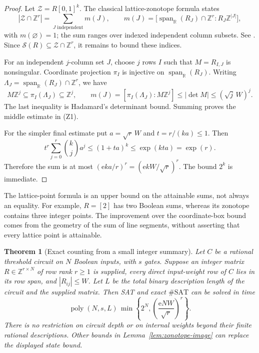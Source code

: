 \documentclass[11pt]{article}
\newtheorem{theorem}{Theorem}[section]
\theoremstyle{definition}
\newcommand{\R}{\mathbb R}
\newcommand{\Z}{\mathbb Z}
\newcommand{\poly}{\operatorname{poly}}
\newcommand{\Eul}{\mathrm e}
\begin{document}
\begin{proof}
Let \(\mathcal Z=R[0,1]^k\). The classical lattice-zonotope formula states
\[
 |\mathcal Z\cap\Z^r|
 =\sum_{J\text{ independent}}m(J),\qquad
 m(J)=\bigl[\operatorname{span}_{\R}(R_J)\cap\Z^r:
                    R_J\Z^{|J|}\bigr],                  \tag{Z2}
\]
with \(m(\varnothing)=1\); the sum ranges over indexed independent column
subsets. See \cite[Section 2.2 and equation (2)]{DM11}. Since
\(\mathcal S(R)\subseteq\mathcal Z\cap\Z^r\), it remains to bound these indices.

For an independent \(j\)-column set \(J\), choose \(j\) rows \(I\) such that
\(M=R_{I,J}\) is nonsingular. Coordinate projection \(\pi_I\) is injective
on \(\operatorname{span}_{\R}(R_J)\). Writing
\(\Lambda_J=\operatorname{span}_{\R}(R_J)\cap\Z^r\), we have
\[
 M\Z^j\subseteq\pi_I(\Lambda_J)\subseteq\Z^j,
 \qquad
 m(J)=[\pi_I(\Lambda_J):M\Z^j]
       \le |\det M|
       \le(\sqrt j\,W)^j.
\]
The last inequality is Hadamard's determinant bound. Summing proves the
middle estimate in (Z1).

For the simpler final estimate put \(a=\sqrt r\,W\) and
\(t=r/(ka)\le1\). Then
\[
 t^r\sum_{j=0}^r\binom kj a^j
 \le(1+ta)^k\le\exp(kta)=\exp(r).
\]
Therefore the sum is at most
\((\Eul ka/r)^r=(\Eul kW/\sqrt r)^r\). The bound \(2^k\) is immediate.
\end{proof}

The lattice-point formula is an upper bound on the attainable sums, not
always an equality. For example, \(R=[2]\) has two Boolean sums, whereas
its zonotope contains three integer points. The improvement over the
coordinate-box bound comes from the geometry of the sum of line segments,
without asserting that every lattice point is attainable.

\begin{theorem}[Exact counting from a small integer summary]
\label{thm:zonotope-counting}
Let \(C\) be a rational threshold circuit on \(N\) Boolean inputs, with
\(s\) gates. Suppose an integer matrix \(R\in\Z^{r\times N}\) of row rank
\(r\ge1\) is supplied, every direct input-weight row of \(C\) lies in its
row span, and \(|R_{ij}|\le W\). Let \(L\) be the total binary description
length of the circuit and the supplied matrix. Then SAT and exact \(\#\mathrm{SAT}\)
can be solved in time
\[
 \poly(N,s,L)\,
 \min\left\{2^N,
       \left(\frac{\Eul NW}{\sqrt r}\right)^r\right\}.   \tag{Z3}
\]
There is no restriction on circuit depth or on internal weights beyond
their finite rational descriptions. Other bounds in Lemma~\ref{lem:zonotope-image}
can replace the displayed state bound.
\end{theorem}
\end{document}
